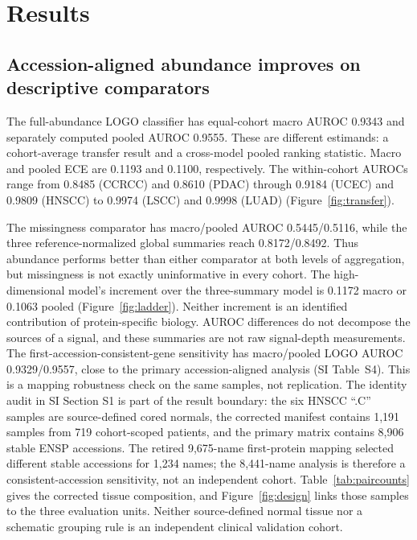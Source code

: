 \section{Results}

\subsection{Accession-aligned abundance improves on descriptive comparators}

The full-abundance LOGO classifier has equal-cohort macro AUROC 0.9343
and separately computed pooled AUROC 0.9555. These are different
estimands: a cohort-average transfer result and a cross-model pooled
ranking statistic. Macro and pooled ECE are 0.1193 and 0.1100,
respectively. The within-cohort AUROCs range from 0.8485 (CCRCC) and
0.8610 (PDAC) through 0.9184 (UCEC) and 0.9809 (HNSCC) to 0.9974
(LSCC) and 0.9998 (LUAD) (Figure~\ref{fig:transfer}).

The missingness comparator has macro/pooled AUROC 0.5445/0.5116, while
the three reference-normalized global summaries reach 0.8172/0.8492.
Thus abundance performs better than either comparator at both levels
of aggregation, but missingness is not exactly uninformative in every
cohort. The high-dimensional model's increment over the three-summary
model is 0.1172 macro or 0.1063 pooled (Figure~\ref{fig:ladder}).
Neither increment is an identified contribution of protein-specific
biology. AUROC differences do not decompose the sources of a signal,
and these summaries are not raw signal-depth measurements.
The first-accession-consistent-gene sensitivity has macro/pooled LOGO
AUROC 0.9329/0.9557, close to the primary accession-aligned analysis
(SI Table~S4).
This is a mapping robustness check on the same samples, not replication.
The identity audit in SI Section S1 is part of the result boundary: the six
HNSCC ``.C'' samples are source-defined cored normals, the corrected manifest
contains 1,191 samples from 719 cohort-scoped patients, and the primary matrix
contains 8,906 stable ENSP accessions. The retired 9,675-name first-protein
mapping selected different stable accessions for 1,234 names; the 8,441-name
analysis is therefore a consistent-accession sensitivity, not an independent
cohort.
Table~\ref{tab:paircounts} gives the corrected tissue composition, and
Figure~\ref{fig:design} links those samples to the three evaluation units.
Neither source-defined normal tissue nor a schematic grouping rule is an
independent clinical validation cohort.

